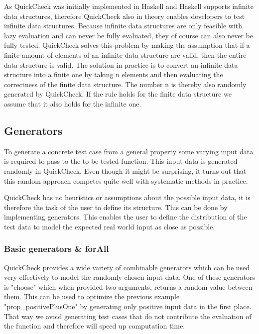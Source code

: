 \documentclass[a4paper, 12pt]{article} %
\begin{document}
As QuickCheck was initially implemented in Haskell and Haskell supports infinite data structures, therefore QuickCheck also in theory enables developers to test infinite data structures. Because infinite data structures are only feasible with lazy evaluation and can never be fully evaluated, they of course can also never be fully tested. QuickCheck solves this problem by making the assumption that if a finite amount of elements of an infinite data structure are valid, then the entire data structure is valid. The solution in practice is to convert an infinite data structure into a finite one by taking n elements and then evaluating the correctness of the finite data structure. The number n is thereby also randomly generated by QuickCheck. If the rule holds for the finite data structure we assume that it also holds for the infinite one. \cite{Claessen2000}

\subsection{Generators}

To generate a concrete test case from a general property some varying input data is required to pass to the to be tested function. This input data is generated randomly in QuickCheck. Even though it might be surprising, it turns out that this random approach competes quite well with systematic methods in practice. \cite{Claessen2000}

QuickCheck has no heuristics or assumptions about the possible input data, it is therefore the task of the user to define its structure. This can be done by implementing generators. This enables the user to define the distribution of the test data to model the expected real world input as close as possible.


\subsubsection{Basic generators \& forAll}

QuickCheck provides a wide variety of combinable generators which can be used very effectively to model the randomly chosen input data. One of these generators is "choose" which when provided two arguments, returns a random value between them. This can be used to optimize the previous example "prop\_positivePlusOne" by generating only positive input data in the first place. That way we avoid generating test cases that do not contribute the evaluation of the function and therefore will speed up computation time. 
\end{document}
